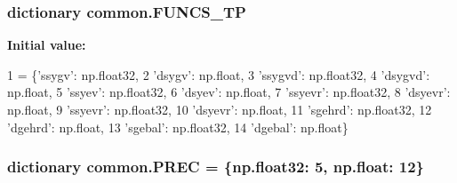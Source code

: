 \subsubsection[{F\+U\+N\+C\+S\+\_\+\+T\+P}]{\setlength{\rightskip}{0pt plus 5cm}dictionary common.\+F\+U\+N\+C\+S\+\_\+\+T\+P}\label{namespacecommon_a5ffbc785fdd71516c72c0781cb363dfa}
{\bfseries Initial value\+:}
\begin{DoxyCode}
1 = \{\textcolor{stringliteral}{'ssygv'}: np.float32,
2          \textcolor{stringliteral}{'dsygv'}: np.float,
3          \textcolor{stringliteral}{'ssygvd'}: np.float32,
4          \textcolor{stringliteral}{'dsygvd'}: np.float,
5          \textcolor{stringliteral}{'ssyev'}: np.float32,
6          \textcolor{stringliteral}{'dsyev'}: np.float,
7          \textcolor{stringliteral}{'ssyevr'}: np.float32,
8          \textcolor{stringliteral}{'dsyevr'}: np.float,
9          \textcolor{stringliteral}{'ssyevr'}: np.float32,
10          \textcolor{stringliteral}{'dsyevr'}: np.float,
11          \textcolor{stringliteral}{'sgehrd'}: np.float32,
12          \textcolor{stringliteral}{'dgehrd'}: np.float,
13          \textcolor{stringliteral}{'sgebal'}: np.float32,
14          \textcolor{stringliteral}{'dgebal'}: np.float\}
\end{DoxyCode}
\hypertarget{namespacecommon_a6ab9da973403637ef8f58179de21a6f9}{}
\subsubsection[{P\+R\+E\+C}]{\setlength{\rightskip}{0pt plus 5cm}dictionary common.\+P\+R\+E\+C = \{np.\+float32\+: 5, np.\+float\+: 12\}}\label{namespacecommon_a6ab9da973403637ef8f58179de21a6f9}
